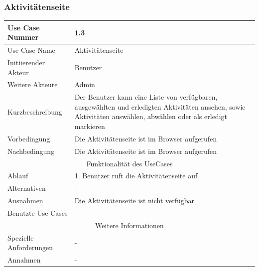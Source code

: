 \documentclass[10pt,a4paper]{article}
\begin{document}
	\subsubsection{Aktivit\"atenseite}
	\begin{tabular}{|l|p{.5\linewidth}|}
	\hline Use Case Nummer & 1.3 \\ 
	\hline Use Case Name & Aktivit\"atenseite \\ 
	\hline Initiierender Akteur & Benutzer \\
	\hline Weitere Akteure & Admin \\
	\hline Kurzbeschreibung & Der Benutzer kann eine Liste von verf\"ugbaren, ausgew\"ahlten und erledigten Aktivit\"aten ansehen, sowie Aktivit\"aten ausw\"ahlen, abw\"ahlen oder als erledigt markieren \\
	\hline Vorbedingung & Die Aktivit\"atenseite ist im Browser aufgerufen \\
	\hline Nachbedingung & Die Aktivit\"atenseite ist im Browser aufgerufen \\
	\hline \multicolumn{2}{|c|}{Funktionalität des UseCases}\\
	\hline Ablauf & 1. Benutzer ruft die Aktivit\"atenseite auf \\
	\hline Alternativen & - \\
	\hline Ausnahmen & Die Aktivit\"atenseite ist nicht verf\"ugbar \\
	\hline Benutzte Use Cases & - \\
	\hline \multicolumn{2}{|c|}{Weitere Informationen} \\
	\hline Spezielle Anforderungen & - \\
	\hline Annahmen & - \\
	\hline
	\end{tabular} 
\end{document}
